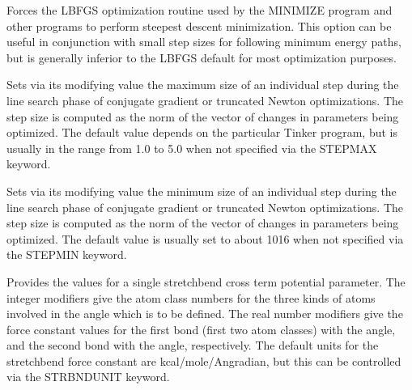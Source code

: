 \documentclass[letterpaper,11pt,english]{sphinxmanual}
\begin{document}
\ignorespaces {}\label{\detokenize{text/keywords:key-steepest-descent}}\begin{description}
\sphinxAtStartPar
Forces the L\sphinxhyphen{}BFGS optimization routine used by the MINIMIZE program and other programs to perform steepest descent minimization. This option can be useful in conjunction with small step sizes for following minimum energy paths, but is generally inferior to the L\sphinxhyphen{}BFGS default for most optimization purposes.

\end{description}

\ignorespaces {}\label{\detokenize{text/keywords:key-stepmax}}\begin{description}
\sphinxAtStartPar
Sets via its modifying value the maximum size of an individual step during the line search phase of conjugate gradient or truncated Newton optimizations. The step size is computed as the norm of the vector of changes in parameters being optimized. The default value depends on the particular Tinker program, but is usually in the range from 1.0 to 5.0 when not specified via the STEPMAX keyword.

\end{description}

\ignorespaces {}\label{\detokenize{text/keywords:key-stepmin}}\begin{description}
\sphinxAtStartPar
Sets via its modifying value the minimum size of an individual step during the line search phase of conjugate gradient or truncated Newton optimizations. The step size is computed as the norm of the vector of changes in parameters being optimized. The default value is usually set to about 10\sphinxhyphen{}16 when not specified via the STEPMIN keyword.

\end{description}

\ignorespaces {}\label{\detokenize{text/keywords:key-strbnd}}\begin{description}
\sphinxAtStartPar
Provides the values for a single stretch\sphinxhyphen{}bend cross term potential parameter. The integer modifiers give the atom class numbers for the three kinds of atoms involved in the angle which is to be defined. The real number modifiers give the force constant values for the first bond (first two atom classes) with the angle, and the second bond with the angle, respectively. The default units for the stretch\sphinxhyphen{}bend force constant are kcal/mole/Ang\sphinxhyphen{}radian, but this can be controlled via the STRBNDUNIT keyword.

\end{description}
\end{document}
